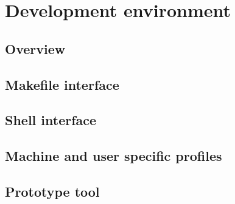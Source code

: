 
%
%

\chapter{Development environment}

\newpage

\section{Overview}

\section{Makefile interface}

\section{Shell interface}

\section{Machine and user specific profiles}

\section{Prototype tool}


